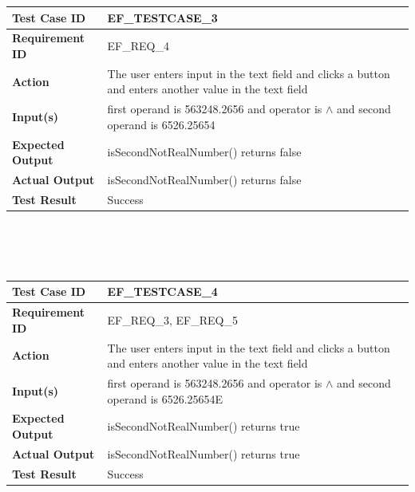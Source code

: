 \documentclass[11pt, english]{report}
\begin{document}
\setlength{\tabcolsep}{18pt}
\renewcommand{\arraystretch}{1.5}
\begin{tabular}{ |p{2.2cm}|p{9.8cm}| }
\hline
\textbf{Test Case ID} & EF\_TESTCASE\_3 \\ \hline 
\textbf{Requirement ID} & EF\_REQ\_4\\ \hline
\textbf{Action} & The user enters input in the text field and clicks a button and enters another value in the text field\\ \hline
\textbf{Input(s)} & first operand is 563248.2656 and operator is $\wedge$ and second operand is 6526.25654 \\ \hline
\textbf{Expected Output} & isSecondNotRealNumber() returns false \\ \hline
\textbf{Actual Output} & isSecondNotRealNumber() returns false \\ \hline
\textbf{Test Result} & Success \\ 
\hline
\end{tabular} \\ \\ \\

\setlength{\tabcolsep}{18pt}
\renewcommand{\arraystretch}{1.5}
\begin{tabular}{ |p{4cm}|p{8cm}| }
\hline
\textbf{Test Case ID} &  EF\_TESTCASE\_4 \\ \hline 
\textbf{Requirement ID} & EF\_REQ\_3, EF\_REQ\_5\\ \hline
\textbf{Action} & The user enters input in the text field and clicks a button and enters another value in the text field\\ \hline
\textbf{Input(s)} & first operand is 563248.2656 and operator is $\wedge$ and second operand is 6526.25654E \\ \hline
\textbf{Expected Output} & isSecondNotRealNumber() returns true \\ \hline
\textbf{Actual Output} & isSecondNotRealNumber() returns true \\ \hline
\textbf{Test Result} & Success \\ 
\hline
\end{tabular} \\ \\ \\
\end{document}

